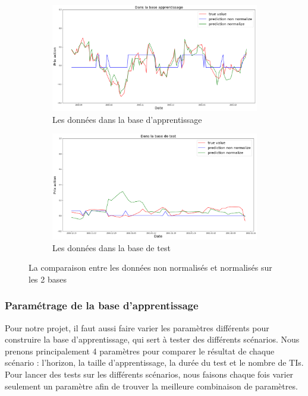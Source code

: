 \begin{figure}[H]
\centering
	\begin{subfigure}{.5\textwidth}
	\centering
	\includegraphics[width=.9\linewidth, scale=0.2]
	{plot/norma.png}
	\caption{Les données dans la base d'apprentissage}
	\label{fig:Base_A}
	\end{subfigure}%
	\begin{subfigure}{.5\textwidth}
	\centering
	\includegraphics[width=.9\linewidth, scale=0.2]
	{plot/non_norma.png}
	\caption{Les données dans la base de test}
	\label{fig:Base_T}
	\end{subfigure}
\caption{La comparaison entre les données non normalisés et normalisés sur les 2 bases}
\label{fig: normalisation}
\end{figure}

\subsubsection{Paramétrage de la base d'apprentissage}

Pour notre projet, il faut aussi faire varier les paramètres différents pour construire la base d'apprentissage, qui sert à tester des différents scénarios. Nous prenons principalement 4 paramètres pour comparer le résultat de chaque scénario : l'horizon, la taille d'apprentissage, la durée du test et le nombre de TIs. Pour lancer des tests sur les différents scénarios, nous faisons chaque fois varier seulement un paramètre afin de trouver la meilleure combinaison de paramètres.\\

